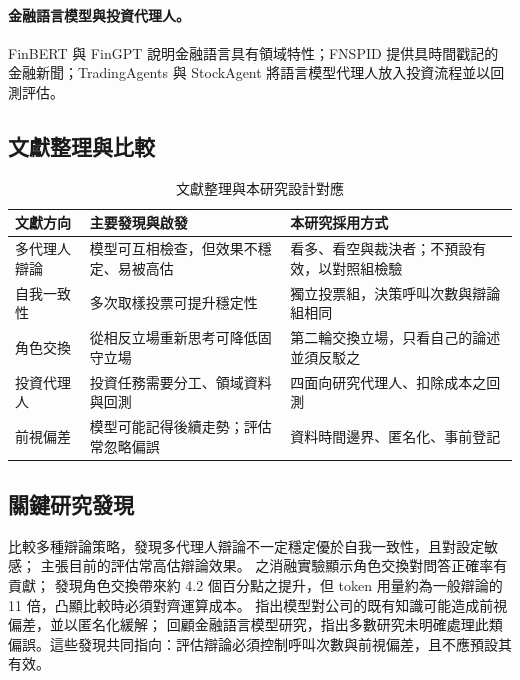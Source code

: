 \documentclass[12pt,a4paper]{article}
\begin{document}
\begin{CJK}{UTF8}{bkai}
\paragraph{金融語言模型與投資代理人。} FinBERT \citep{araci2019finbert} 與 FinGPT \citep{liu2023fingpt} 說明金融語言具有領域特性；FNSPID \citep{dong2024fnspid} 提供具時間戳記的金融新聞；TradingAgents \citep{xiao2024tradingagents} 與 StockAgent \citep{zhang2024stockagent} 將語言模型代理人放入投資流程並以回測評估。

\subsection{文獻整理與比較}

\begin{table}[H]
\centering\small
\caption{文獻整理與本研究設計對應}
\label{tab:litmap}
\begin{tabularx}{\textwidth}{@{}l Y Y@{}}
\toprule
文獻方向 & 主要發現與啟發 & 本研究採用方式 \\
\midrule
多代理人辯論 & 模型可互相檢查，但效果不穩定、易被高估 & 看多、看空與裁決者；不預設有效，以對照組檢驗 \\
自我一致性 & 多次取樣投票可提升穩定性 & 獨立投票組，決策呼叫次數與辯論組相同 \\
角色交換 & 從相反立場重新思考可降低固守立場 & 第二輪交換立場，只看自己的論述並須反駁之 \\
投資代理人 & 投資任務需要分工、領域資料與回測 & 四面向研究代理人、扣除成本之回測 \\
前視偏差 & 模型可能記得後續走勢；評估常忽略偏誤 & 資料時間邊界、匿名化、事前登記 \\
\bottomrule
\end{tabularx}
\end{table}

\subsection{關鍵研究發現}

\citet{smit2023mad} 比較多種辯論策略，發現多代理人辯論不一定穩定優於自我一致性，且對設定敏感；\citet{zhang2025stop} 主張目前的評估常高估辯論效果。\citet{liu2025roleswitch} 之消融實驗顯示角色交換對問答正確率有貢獻；\citet{chowdhury2026proclaim} 發現角色交換帶來約 4.2 個百分點之提升，但 token 用量約為一般辯論的 11 倍，凸顯比較時必須對齊運算成本。\citet{glasserman2023lookahead} 指出模型對公司的既有知識可能造成前視偏差，並以匿名化緩解；\citet{kong2026bias} 回顧金融語言模型研究，指出多數研究未明確處理此類偏誤。這些發現共同指向：評估辯論必須控制呼叫次數與前視偏差，且不應預設其有效。


\end{CJK}
\end{document}
